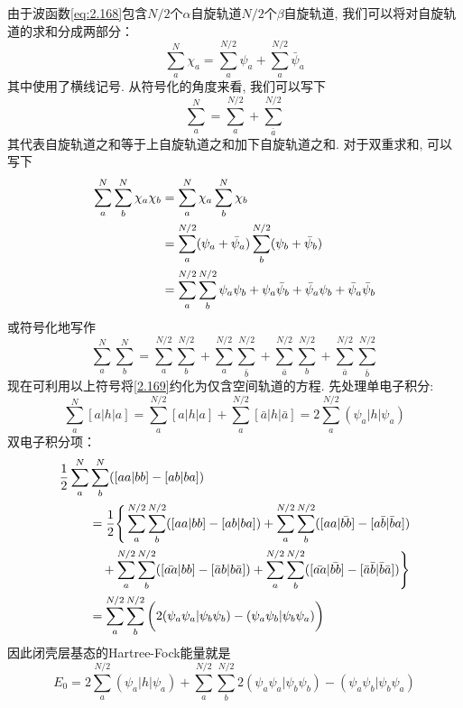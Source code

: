 由于波函数\autoref{eq:2.168}包含$N/2$个$\alpha$自旋轨道$N/2$个$\beta$自旋轨道, 
我们可以将对自旋轨道的求和分成两部分：
\begin{equation}
\sum_{a}^{N} \chi_a = \sum_{a}^{N/2}\psi_a + \sum_{a}^{N/2}\bar{\psi}_a
\end{equation} 
其中使用了横线记号. 
从符号化的角度来看, 
我们可以写下
\begin{equation}
\sum_{a}^{N} = \sum_{a}^{N/2} + \sum_{\bar{a}}^{N/2}
\end{equation}
其代表自旋轨道之和等于上自旋轨道之和加下自旋轨道之和. 
对于双重求和, 
可以写下
\begin{align}
\sum_{a}^{N}\sum_{b}^{N}\chi_a\chi_b & = \sum_{a}^{N}\chi_a\sum_{b}^{N}\chi_b\notag\\
& = \sum_{a}^{N/2}(\psi_a + \bar{\psi}_a)\sum_{b}^{N/2}(\psi_b + \bar{\psi}_b) \notag\\ 
& = \sum_{a}^{N/2}\sum_{b}^{N/2}\psi_a\psi_b + \psi_a\bar{\psi}_b + \bar{\psi}_a{\psi}_b + \bar{\psi}_a\bar{\psi}_b 
\end{align}
或符号化地写作
\begin{equation}
\sum_{a}^{N}\sum_{b}^{N} = \sum_{a}^{N/2}\sum_{b}^{N/2} + \sum_{a}^{N/2}\sum_{\bar{b}}^{N/2} + \sum_{\bar{a}}^{N/2}\sum_{b}^{N/2} + \sum_{\bar{a}}^{N/2}\sum_{\bar{b}}^{N/2}
\end{equation}
现在可利用以上符号将\autoref{2.169}约化为仅含空间轨道的方程. 
先处理单电子积分:
\begin{equation}
\sum_{a}^{N}[a|h|a] = \sum_{a}^{N/2}[a|h|a] + \sum_{a}^{N/2}[\bar{a}|h|\bar{a}] = 2 \sum_{a}^{N/2}(\psi_a|h|\psi_a)
\end{equation}
双电子积分项：
\begin{align}
\frac{1}{2}\sum_{a}^{N} & \sum_{b}^{N}([aa|bb] - [ab|ba])\notag\\
& = \frac{1}{2}\Bigg\{ \sum_{a}^{N/2}\sum_{b}^{N/2}([aa|bb]-[ab|ba]) + \sum_{a}^{N/2}\sum_{b}^{N/2}([aa|\bar{bb}] -[a\bar{b}|\bar{b}a])\notag \\   
& \quad + \sum_{a}^{N/2}\sum_{b}^{N/2}([\bar{aa}|bb] - [\bar{a}b|b\bar{a}]) + \sum_{a}^{N/2}\sum_{b}^{N/2}([\bar{aa}|\bar{bb}] - [\bar{a}\bar{b}|\bar{b}\bar{a}]) \Bigg\}\notag\\
& = \sum_{a}^{N/2}\sum_{b}^{N/2} \bigg(2 (\psi_a\psi_a|\psi_b\psi_b) - (\psi_a\psi_b|\psi_b\psi_a)\bigg)
\end{align}
因此闭壳层基态的Hartree-Fock能量就是
\begin{equation}
\label{2.176}
E_0 = 2 \sum_{a}^{N/2}(\psi_a|h|\psi_a) + \sum_{a}^{N/2}\sum_{b}^{N/2}2(\psi_a\psi_a|\psi_b\psi_b) - (\psi_a\psi_b|\psi_b\psi_a)
\end{equation}
